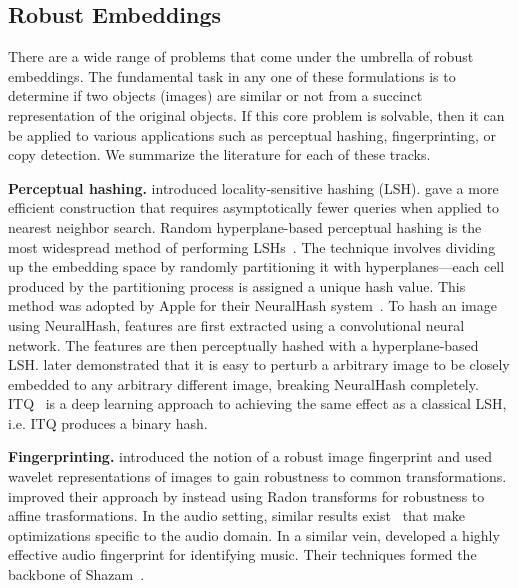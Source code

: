 \documentclass[12pt]{article}
\begin{document}
\subsection{Robust Embeddings}\label{subsec:robust_embeddings}

There are a wide range of problems that come under the umbrella of robust embeddings.
The fundamental task in any one of these formulations is to determine if two objects (images) are similar or not from a succinct representation of the original objects.
If this core problem is solvable, then it can be applied to various applications such as perceptual hashing, fingerprinting, or copy detection.
We summarize the literature for each of these tracks.

\textbf{Perceptual hashing.}
\citet{indyk1998approximate} introduced locality-sensitive hashing (LSH).
\citet{gionis1999similarity} gave a more efficient construction that requires asymptotically fewer queries when applied to nearest neighbor search.
Random hyperplane-based perceptual hashing is the most widespread method of performing LSHs~\citep{charikar2002similarity}.
The technique involves dividing up the embedding space by randomly partitioning it with hyperplanes---each cell produced by the partitioning process is assigned a unique hash value.
This method was adopted by Apple for their NeuralHash system~\citep{apple2021csam}.
To hash an image using NeuralHash, features are first extracted using a convolutional neural network.
The features are then perceptually hashed with a hyperplane-based LSH.
\citet{struppek2022learning} later demonstrated that it is easy to perturb a arbitrary image to be closely embedded to any arbitrary different image, breaking NeuralHash completely.
ITQ~\citep{ge2013optimized} is a deep learning approach to achieving the same effect as a classical LSH, i.e. ITQ produces a binary hash.

\textbf{Fingerprinting.}
\citet{venkatesan2000robust} introduced the notion of a robust image fingerprint and used wavelet representations of images to gain robustness to common transformations.
\citet{seo2004robust} improved their approach by instead using Radon transforms for robustness to affine trasformations.
In the audio setting, similar results exist~\citep{haitsma2002highly} that make optimizations specific to the audio domain.
In a similar vein, \citet{wang2003industrial} developed a highly effective audio fingerprint for identifying music.
Their techniques formed the backbone of Shazam~\citep{wang2006shazam}.
\end{document}
